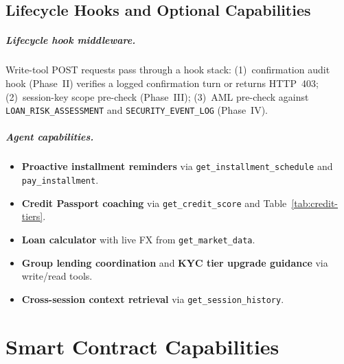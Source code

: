 \documentclass[12pt,a4paper]{report}
\begin{document}
\section{Lifecycle Hooks and Optional Capabilities}

\paragraph{Lifecycle hook middleware.}
Write-tool POST requests pass through a hook stack: (1)~confirmation audit hook (Phase~II) verifies a logged confirmation turn or returns HTTP~403; (2)~session-key scope pre-check (Phase~III); (3)~AML pre-check against \texttt{LOAN\_RISK\_ASSESSMENT} and \texttt{SECURITY\_EVENT\_LOG} (Phase~IV).

\paragraph{Agent capabilities.}
\begin{itemize}[noitemsep]
\item \textbf{Proactive installment reminders} via \texttt{get\_installment\_schedule} and \texttt{pay\_installment}.
\item \textbf{Credit Passport coaching} via \texttt{get\_credit\_score} and Table~\ref{tab:credit-tiers}.
\item \textbf{Loan calculator} with live FX from \texttt{get\_market\_data}.
\item \textbf{Group lending coordination} and \textbf{KYC tier upgrade guidance} via write/read tools.
\item \textbf{Cross-session context retrieval} via \texttt{get\_session\_history}.
\end{itemize}

\chapter{Smart Contract Capabilities}
\label{app:smart-contract-capabilities}
\end{document}

